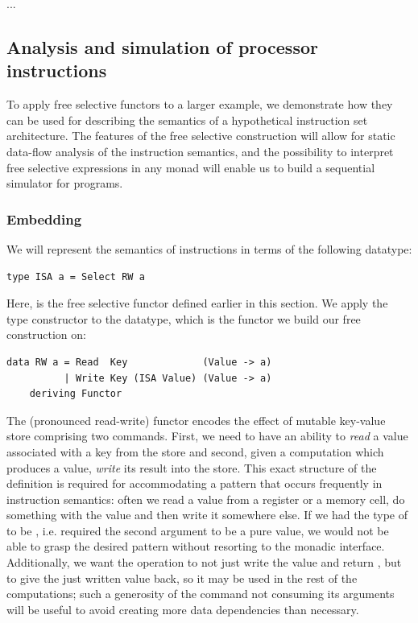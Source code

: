 ...

\subsection{Analysis and simulation of processor instructions}\label{sec-free-isa}

To apply free selective functors to a larger example, we demonstrate
how they can be used for describing the semantics of a hypothetical
instruction set architecture. The features of the free selective construction will
allow for static data-flow analysis of the instruction semantics, and the possibility
to interpret free selective expressions in any monad will enable us to build a
sequential simulator for programs.

\subsubsection{Embedding}

We will represent the semantics of instructions in terms of the following datatype:

\begin{verbatim}
type ISA a = Select RW a
\end{verbatim}

Here,  is the free selective functor defined earlier in this section.
We apply the  type constructor to the  datatype, which is the
functor we build our free construction on:

\begin{verbatim}
data RW a = Read  Key             (Value -> a)
          | Write Key (ISA Value) (Value -> a)
    deriving Functor
\end{verbatim}

The  (pronounced read-write) functor encodes the effect of mutable key-value store
comprising two commands.
First, we need to have an ability to \emph{read} a value associated with a key from the store
and second, given a computation which produces a value, \emph{write} its result into the store.
This exact structure of the definition is required for accommodating a pattern that
occurs frequently in instruction semantics: often we read a value from a register or a memory
cell, do something with the value and then write it somewhere else.
If we had the type of  to be , i.e. required
the second argument to be a pure value,
we would not be able to grasp the desired pattern without resorting to the monadic interface.
Additionally, we want the 
operation to not just write the value and return \hs{()}, but to give the just written value
back, so it may be used in the rest of the computations; such a generosity of the 
command not consuming its arguments will be useful to avoid creating more data dependencies
than necessary.

